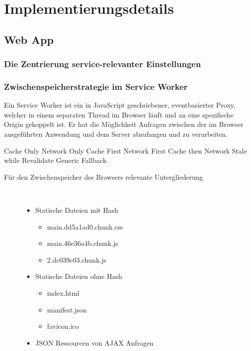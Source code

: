 \chapter{Implementierungsdetails}
\label{chap:implementierungsdetails}

\section{Web App}
\subsection{Die Zentrierung service-relevanter Einstellungen}

\subsection{Zwischenspeicherstrategie im Service Worker}
Ein Service Worker ist ein in JavaScript geschriebener,
eventbasierter Proxy, welcher in einem separaten Thread im Browser
läuft und an eine spezifische Origin gekoppelt ist. Er hat
die Möglichkeit Anfragen zwischen der im Browser ausgeführten
Anwendung und dem Server abzufangen und zu verarbeiten.

Cache Only
Network Only
Cache First
Network First
Cache then Network
Stale while Revalidate
Generic Fallback

\begin{description}
    \item[Für den Zwischenspeicher des Browsers relevante Untergliederung]~\par
    \begin{itemize}
       \item Statische Dateien mit Hash
       \begin{itemize}
            \item main.dd5a1ad0.chunk.css
            \item main.46e36a4b.chunk.js
            \item 2.dc039c03.chunk.js
       \end{itemize}
       \item Statische Dateien ohne Hash
       \begin{itemize}
            \item index.html
            \item manifest.json
            \item favicon.ico
       \end{itemize}
       \item JSON Ressourcen von AJAX Anfragen
    \end{itemize}
\end{description}


